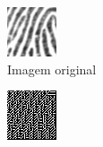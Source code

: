 \documentclass[10pt,a4paper]{article}
\begin{document}
\begin{figure}[!ht]
    \centering
    \begin{subfigure}[ht]{0.20\textwidth}
        \includegraphics[width=\textwidth]{4.jpg}
        \caption{Imagem original}
    \end{subfigure}
    \qquad
    \begin{subfigure}[ht]{0.20\textwidth}
        \includegraphics[width=\textwidth]{4_filtered_window_3.jpg}

\end{subfigure}
\end{figure}
\end{document}
